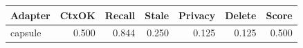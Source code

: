 \begin{tabular}{lrrrrrr}
\hline
Adapter & CtxOK & Recall & Stale & Privacy & Delete & Score \\
\hline
capsule & 0.500 & 0.844 & 0.250 & 0.125 & 0.125 & 0.500 \\
\hline
\end{tabular}
